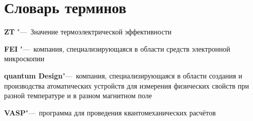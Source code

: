 \chapter*{Словарь терминов}             %

\textbf{ZT} "---~Значение термоэлектрической эффективности

\textbf{FEI} "---~компания, специализирующаяся в области средств электронной микроскопии

\textbf{quantum Design}"---~компания, специализирующаяся в области создания и производства атоматических устройств для измерения физических свойств при разной температуре и в разном магнитном поле

\textbf{VASP}"---~программа для проведения квантомеханических расчётов 